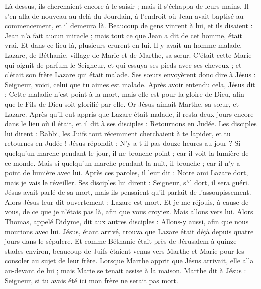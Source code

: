 \begin{multicols}{2}
Là-dessus, ils cherchaient encore à le saisir ; mais il s'échappa de leurs mains.
Il s'en alla de nouveau au-delà du Jourdain, à l'endroit où Jean avait baptisé au commencement, et il demeura là.
Beaucoup de gens vinrent à lui, et ils disaient : Jean n'a fait aucun miracle ; mais tout ce que Jean a dit de cet homme, était vrai.
Et dans ce lieu-là, plusieurs crurent en lui.
\VerseOne{}Il y avait un homme malade, Lazare, de Béthanie, village de Marie et de Marthe, sa sœur.
C'était cette Marie qui oignit de parfum le Seigneur, et qui essuya ses pieds avec ses cheveux ; et c'était son frère Lazare qui était malade.
Ses sœurs envoyèrent donc dire à Jésus : Seigneur, voici, celui que tu aimes est malade.
Après avoir entendu cela, Jésus dit : Cette maladie n'est point à la mort, mais elle est pour la gloire de Dieu, afin que le Fils de Dieu soit glorifié par elle.
Or Jésus aimait Marthe, sa sœur, et Lazare.
Après qu'il eut appris que Lazare était malade, il resta deux jours encore dans le lieu où il était,
et il dit à ses disciples : Retournons en Judée.
Les disciples lui dirent : Rabbi, les Juifs tout récemment cherchaient à te lapider, et tu retournes en Judée !
Jésus répondit : N'y a-t-il pas douze heures au jour ? Si quelqu'un marche pendant le jour, il ne bronche point ; car il voit la lumière de ce monde.
Mais si quelqu'un marche pendant la nuit, il bronche ; car il n'y a point de lumière avec lui.
Après ces paroles, il leur dit : Notre ami Lazare dort, mais je vais le réveiller.
Ses disciples lui dirent : Seigneur, s'il dort, il sera guéri.
Jésus avait parlé de sa mort, mais ils pensaient qu'il parlait de l'assoupissement.
Alors Jésus leur dit ouvertement : Lazare est mort.
Et je me réjouis, à cause de vous, de ce que je n'étais pas là, afin que vous croyiez. Mais allons vers lui.
Alors Thomas, appelé Didyme, dit aux autres disciples : Allons-y aussi, afin que nous mourions avec lui.
Jésus, étant arrivé, trouva que Lazare était déjà depuis quatre jours dans le sépulcre.
Et comme Béthanie était près de Jérusalem à quinze stades environ,
beaucoup de Juifs étaient venus vers Marthe et Marie pour les consoler au sujet de leur frère.
Lorsque Marthe apprit que Jésus arrivait, elle alla au-devant de lui ; mais Marie se tenait assise à la maison.
Marthe dit à Jésus : Seigneur, si tu avais été ici mon frère ne serait pas mort.

\end{multicols}
